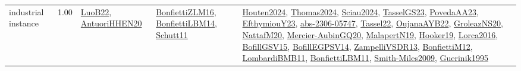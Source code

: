 {\begin{longtable}{p{3cm}r>{\raggedright\arraybackslash}p{6cm}>{\raggedright\arraybackslash}p{6cm}>{\raggedright\arraybackslash}p{8cm}}
\index{industrial instance}\index{Benchmarks!industrial instance}industrial instance &  1.00 & \hyperref[detail:LuoB22]{LuoB22}, \hyperref[detail:AntuoriHHEN20]{AntuoriHHEN20} & \hyperref[detail:BonfiettiZLM16]{BonfiettiZLM16}, \hyperref[detail:BonfiettiLBM14]{BonfiettiLBM14}, \hyperref[detail:Schutt11]{Schutt11} & \hyperref[detail:Houten2024]{Houten2024}, \hyperref[detail:Thomas2024]{Thomas2024}, \hyperref[detail:Sciau2024]{Sciau2024}, \hyperref[detail:TasselGS23]{TasselGS23}, \hyperref[detail:PovedaAA23]{PovedaAA23}, \hyperref[detail:EfthymiouY23]{EfthymiouY23}, \hyperref[detail:abs-2306-05747]{abs-2306-05747}, \hyperref[detail:Tassel22]{Tassel22}, \hyperref[detail:OujanaAYB22]{OujanaAYB22}, \hyperref[detail:GroleazNS20]{GroleazNS20}, \hyperref[detail:NattafM20]{NattafM20}, \hyperref[detail:Mercier-AubinGQ20]{Mercier-AubinGQ20}, \hyperref[detail:MalapertN19]{MalapertN19}, \hyperref[detail:Hooker19]{Hooker19}, \hyperref[detail:Lorca2016]{Lorca2016}, \hyperref[detail:BofillGSV15]{BofillGSV15}, \hyperref[detail:BofillEGPSV14]{BofillEGPSV14}, \hyperref[detail:ZampelliVSDR13]{ZampelliVSDR13}, \hyperref[detail:BonfiettiM12]{BonfiettiM12}, \hyperref[detail:LombardiBMB11]{LombardiBMB11}, \hyperref[detail:BonfiettiLBM11]{BonfiettiLBM11}, \hyperref[detail:Smith-Miles2009]{Smith-Miles2009}, \hyperref[detail:Guerinik1995]{Guerinik1995}\\

\end{longtable}}
